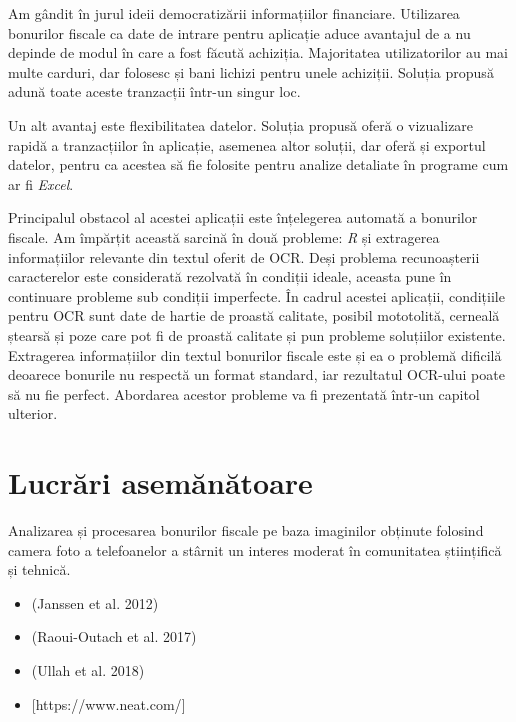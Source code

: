 Am gândit \AppName{} în jurul ideii democratizării informațiilor financiare. Utilizarea bonurilor fiscale ca date de intrare pentru aplicație aduce avantajul de a nu depinde de modul în care a fost făcută achiziția. Majoritatea utilizatorilor au mai multe carduri, dar folosesc și bani lichizi pentru unele achiziții. Soluția propusă adună toate aceste tranzacții într-un singur loc.

Un alt avantaj este flexibilitatea datelor. Soluția propusă oferă o vizualizare rapidă a tranzacțiilor în aplicație, asemenea altor soluții, dar oferă și exportul datelor, pentru ca acestea să fie folosite pentru analize detaliate în programe cum ar fi \emph{Excel}.

Principalul obstacol al acestei aplicații este înțelegerea automată a bonurilor fiscale. Am împărțit această sarcină în două probleme: \emph{R} și extragerea informațiilor relevante din textul oferit de OCR. Deși problema recunoașterii caracterelor este considerată rezolvată în condiții ideale, aceasta pune în continuare probleme sub condiții imperfecte. În cadrul acestei aplicații, condițiile pentru OCR sunt date de hartie de proastă calitate, posibil mototolită, cerneală ștearsă și poze care pot fi de proastă calitate și pun probleme soluțiilor existente. Extragerea informațiilor din textul bonurilor fiscale este și ea o problemă dificilă deoarece bonurile nu respectă un format standard, iar rezultatul OCR-ului poate să nu fie perfect. Abordarea acestor probleme va fi prezentată într-un capitol ulterior.

\section{Lucrări asemănătoare}\label{related_intro}

Analizarea și procesarea bonurilor fiscale pe baza imaginilor obținute folosind camera foto a telefoanelor a stârnit un interes moderat în comunitatea științifică și tehnică.

\begin{itemize}
    \item
        (Janssen et al. 2012) \cite{Receipts2Go}
    \item
        (Raoui-Outach et al. 2017) \cite{DL_receipt_understanding}
    \item
        (Ullah et al. 2018) \cite{Heuristics_extract}
    \item
        {[}https://www.neat.com/{]}
\end{itemize}

